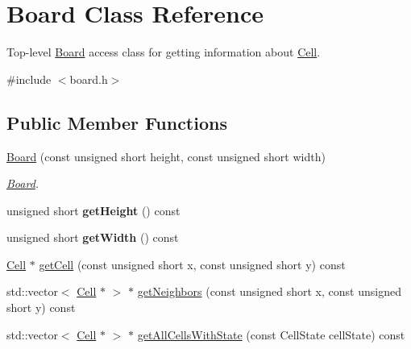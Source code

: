 \hypertarget{class_board}{}\section{Board Class Reference}
\label{class_board}


Top-\/level \hyperlink{class_board}{Board} access class for getting information about \hyperlink{class_cell}{Cell}.  




{\ttfamily \#include $<$board.\+h$>$}

\subsection*{Public Member Functions}
\begin{DoxyCompactItemize}
\item 
\hyperlink{class_board_a872c0c8999c17909cf693df3ce7c78b1}{Board} (const unsigned short height, const unsigned short width)
\begin{DoxyCompactList}\small\item\em \hyperlink{class_board}{Board}. \end{DoxyCompactList}\item 
unsigned short {\bfseries get\+Height} () const \hypertarget{class_board_a6956d7acf362888066765e315b2a9887}{}\label{class_board_a6956d7acf362888066765e315b2a9887}

\item 
unsigned short {\bfseries get\+Width} () const \hypertarget{class_board_a5d27e008e59db3f1a936eebbac0c55d7}{}\label{class_board_a5d27e008e59db3f1a936eebbac0c55d7}

\item 
\hyperlink{class_cell}{Cell} $\ast$ \hyperlink{class_board_ad5c155ecfeec2aa43fa91c511ee5823a}{get\+Cell} (const unsigned short x, const unsigned short y) const 
\item 
std\+::vector$<$ \hyperlink{class_cell}{Cell} $\ast$ $>$ $\ast$ \hyperlink{class_board_a01576a951af1d3a0fb5ebae915ab4e1c}{get\+Neighbors} (const unsigned short x, const unsigned short y) const 
\item 
std\+::vector$<$ \hyperlink{class_cell}{Cell} $\ast$ $>$ $\ast$ \hyperlink{class_board_ad3e2d2c116f0b66293ac8be281875fef}{get\+All\+Cells\+With\+State} (const Cell\+State cell\+State) const 
\end{DoxyCompactItemize}
